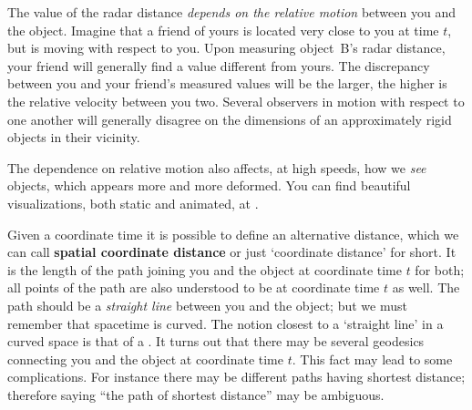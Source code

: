 The value of the radar distance \emph{depends on the relative motion} between you and the object. Imagine that a friend of yours is located very close to you at time $t$, but is moving with respect to you. Upon measuring object~B's radar distance, your friend will generally find a value different from yours. The discrepancy between you and your friend's measured values will be the larger, the higher is the relative velocity between you two. Several observers in motion with respect to one another will generally disagree on the dimensions of an approximately rigid objects in their vicinity.


%
%
The dependence on relative motion also affects, at high speeds, how we \emph{see} objects, which appears more and more deformed. You can find beautiful visualizations, both static and animated, at \textit{}.


\medskip

Given a coordinate time it is possible to define an alternative distance, which we can call \textbf{spatial coordinate distance} or just \enquote*{coordinate distance} for short. It is the length of the path joining you and the object at coordinate time $t$ for both; all points of the path are also understood to be at coordinate time $t$ as well. The path should be a \emph{straight line} between you and the object; but we must remember that spacetime is curved. The notion closest to a \enquote*{straight line} in a curved space is that of a . It turns out that there may be several geodesics connecting you and the object at coordinate time $t$. This fact may lead to some complications. For instance there may be different paths having shortest distance; therefore saying \enquote{the path of shortest distance} may be ambiguous.

